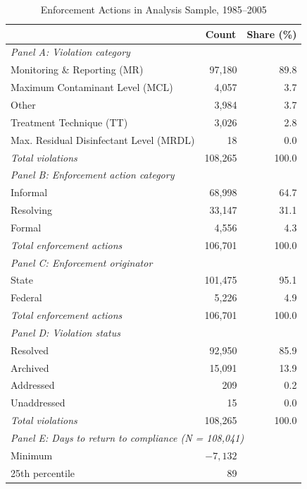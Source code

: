 \begin{table}[h!]
\centering
\caption{Enforcement Actions in Analysis Sample, 1985--2005}
\label{tab:enforcement_profile}
\small
\begin{tabular}{lrr}
\hline\hline
 & \multicolumn{1}{c}{Count} & \multicolumn{1}{c}{Share (\%)} \\
\hline
\multicolumn{3}{l}{\textit{Panel A: Violation category}} \\
Monitoring \& Reporting (MR) & 97,180 & 89.8 \\
Maximum Contaminant Level (MCL) & 4,057 & 3.7 \\
Other & 3,984 & 3.7 \\
Treatment Technique (TT) & 3,026 & 2.8 \\
Max. Residual Disinfectant Level (MRDL) & 18 & 0.0 \\
\hline
\textit{Total violations} & 108,265 & 100.0 \\[6pt]
\multicolumn{3}{l}{\textit{Panel B: Enforcement action category}} \\
Informal & 68,998 & 64.7 \\
Resolving & 33,147 & 31.1 \\
Formal & 4,556 & 4.3 \\
\hline
\textit{Total enforcement actions} & 106,701 & 100.0 \\[6pt]
\multicolumn{3}{l}{\textit{Panel C: Enforcement originator}} \\
State & 101,475 & 95.1 \\
Federal & 5,226 & 4.9 \\
\hline
\textit{Total enforcement actions} & 106,701 & 100.0 \\[6pt]
\multicolumn{3}{l}{\textit{Panel D: Violation status}} \\
Resolved & 92,950 & 85.9 \\
Archived & 15,091 & 13.9 \\
Addressed & 209 & 0.2 \\
Unaddressed & 15 & 0.0 \\
\hline
\textit{Total violations} & 108,265 & 100.0 \\[6pt]
\multicolumn{3}{l}{\textit{Panel E: Days to return to compliance (N = 108,041)}} \\
Minimum & $-7,132$ & \\
25th percentile & 89 & \\

\end{tabular}
\end{table}
